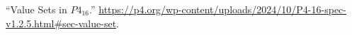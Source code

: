 \documentclass[11pt]{article}
\begin{document}
{{\begin{thebibliography}{45}
\mdbibitemlabel{{}[45]}\textquotedblleft{}Value Sets in $P4_{16}$.\textquotedblright{} \href{https://p4.org/wp-content/uploads/2024/10/P4-16-spec-v1.2.5.html\%23sec-value-set}{{\ttfamily https://\hspace{0pt}p4.\hspace{0pt}org/\hspace{0pt}wp-\hspace{0pt}content/\hspace{0pt}uploads/\hspace{0pt}2024/\hspace{0pt}10/\hspace{0pt}P4-\hspace{0pt}16-\hspace{0pt}spec-\hspace{0pt}v1.\hspace{0pt}2.\hspace{0pt}5.\hspace{0pt}html\#\hspace{0pt}sec-\hspace{0pt}value-\hspace{0pt}set}}.\label{p4valuesets}%
\par%
\end{thebibliography}}%
}%
\end{document}
